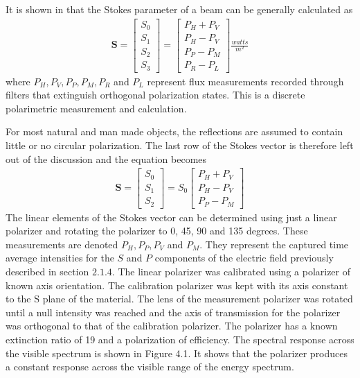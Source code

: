 It is shown in \cite{chipman} that the Stokes parameter of a beam can be generally calculated as
%
\begin{align}
    \mathbf{S} =
    \begin{bmatrix}
        S_0 \\
        S_1 \\
        S_2 \\
        S_3
    \end{bmatrix}
    =
    \begin{bmatrix}
        P_H + P_V \\
        P_H - P_V \\
        P_P - P_M \\
        P_R - P_L
    \end{bmatrix}
    \frac{watts}{m^2}
\end{align}
%
where $P_H, P_V, P_P, P_M, P_R$ and $P_L$ represent flux measurements recorded through filters that extinguish orthogonal polarization states. This is a discrete polarimetric measurement and calculation.

For most natural and man made objects, the reflections are assumed to contain little or no circular polarization. The last row of the Stokes vector is therefore left out of the discussion and the equation becomes
%
\begin{align}
    \mathbf{S} =
    \begin{bmatrix}
        S_0 \\
        S_1 \\
        S_2
    \end{bmatrix}
    =
    S_0
    \begin{bmatrix}
        P_H + P_V \\
        P_H - P_V \\
        P_P - P_M
    \end{bmatrix}
\end{align}
%
The linear elements of the Stokes vector can be determined using just a linear polarizer and rotating the polarizer to 0, 45, 90 and 135 degrees.  These measurements are denoted $P_H, P_P, P_V$ and $P_M$. They represent the captured time average intensities for the $S$ and $P$ components of the electric field previously described in section $2.1.4$.
%
%
The linear polarizer was calibrated using a polarizer of known axis orientation.  The calibration polarizer was kept with its axis constant to the S plane of the material.  The lens of the measurement polarizer was rotated until a null intensity was reached and the axis of transmission for the polarizer was orthogonal to that of the calibration polarizer.  The polarizer has a known extinction ratio of 19 and a polarization of  efficiency.  The spectral response across the visible spectrum is shown in Figure 4.1.  It shows that the polarizer produces a constant response across the visible range of the energy spectrum.

